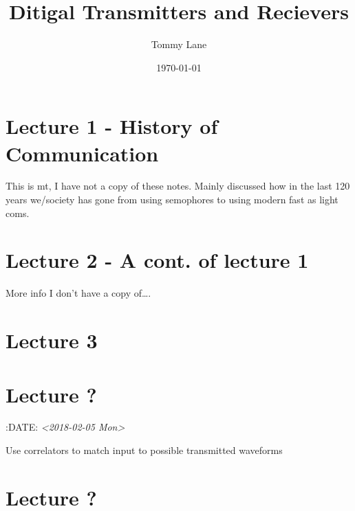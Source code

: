 \documentclass[11pt]{article}
\author{Tommy Lane}
\date{\today}
\title{Ditigal Transmitters and Recievers}
\begin{document}
\maketitle
\tableofcontents

\section{Lecture 1 - History of Communication}
\label{sec-1}
This is mt, I have not a copy of these notes. Mainly discussed how in the last 120 years we/society has gone from using semophores to using modern fast as light coms.
\section{Lecture 2 - A cont. of lecture 1}
\label{sec-2}
More info I don't have a copy of\ldots{}.
\section{Lecture 3}
\label{sec-3}

\section{Lecture ?}
\label{sec-4}
:DATE: \textit{<2018-02-05 Mon>}

Use correlators to match input to possible transmitted waveforms
\section{Lecture ?}
\label{sec-5}
\end{document}
